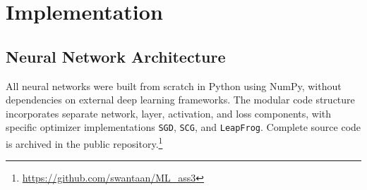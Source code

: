 \documentclass[conference,10pt]{IEEEtran}
\begin{document}
\section{Implementation}



\subsection{Neural Network Architecture}
All neural networks were built from scratch in Python using NumPy, without dependencies on external deep learning frameworks. The modular code structure incorporates separate network, layer, activation, and loss components, with specific optimizer implementations \texttt{SGD}, \texttt{SCG}, and \texttt{LeapFrog}. Complete source code is archived in the public repository.\footnote{\url{https://github.com/swantaan/ML_ass3}}
\end{document}
